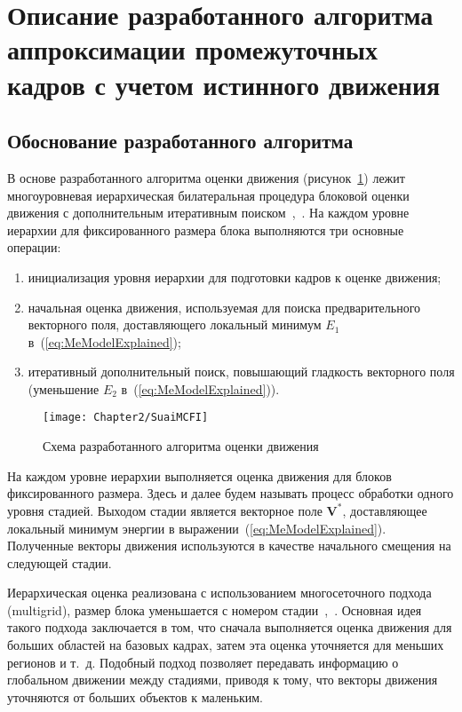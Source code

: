 \section{Описание разработанного алгоритма аппроксимации промежуточных кадров с учетом истинного движения}
\label{chap:SIG:ProposedAlgo}

\subsection{Обоснование разработанного алгоритма}
\label{chap:SIG:ProposedAlgo:Foundation}

В основе разработанного алгоритма оценки движения (рисунок~\ref{fig:ch2:SuaiMCFI}) лежит многоуровневая иерархическая билатеральная процедура блоковой оценки движения с дополнительным итеративным поиском~\cite{VeselovIus},~\cite{6958822}. На каждом уровне иерархии для фиксированного размера блока выполняются три основные операции:
\begin{enumerate}
\item инициализация уровня иерархии для подготовки кадров к оценке движения;
\item начальная оценка движения, используемая для поиска предварительного векторного поля, доставляющего локальный минимум $E_1$ в~(\ref{eq:MeModelExplained});
\item итеративный дополнительный поиск, повышающий гладкость векторного поля (уменьшение $E_2$ в~(\ref{eq:MeModelExplained})).
\end{enumerate}

\begin{figure}[th]
\begin{center}
\texttt{[image: Chapter2/SuaiMCFI]}
\end{center}
\caption{Схема разработанного алгоритма оценки движения}
\label{fig:ch2:SuaiMCFI}
\end{figure}

На каждом уровне иерархии выполняется оценка движения для блоков фиксированного размера. Здесь и далее будем называть процесс обработки одного уровня стадией. Выходом стадии является векторное поле $\mathbf{V}^*$, доставляющее локальный минимум энергии в выражении~(\ref{eq:MeModelExplained}). Полученные векторы движения используются в качестве начального смещения на следующей стадии.

Иерархическая оценка реализована с использованием многосеточного подхода (multigrid), размер блока уменьшается с номером стадии~\cite{Heinrich2011},~\cite{Memin1998}. Основная идея такого подхода заключается в том, что сначала выполняется оценка движения для больших областей на базовых кадрах, затем эта оценка уточняется для меньших регионов и т.~д. Подобный подход позволяет передавать информацию о глобальном движении между стадиями, приводя к тому, что векторы движения уточняются от больших объектов к маленьким.

